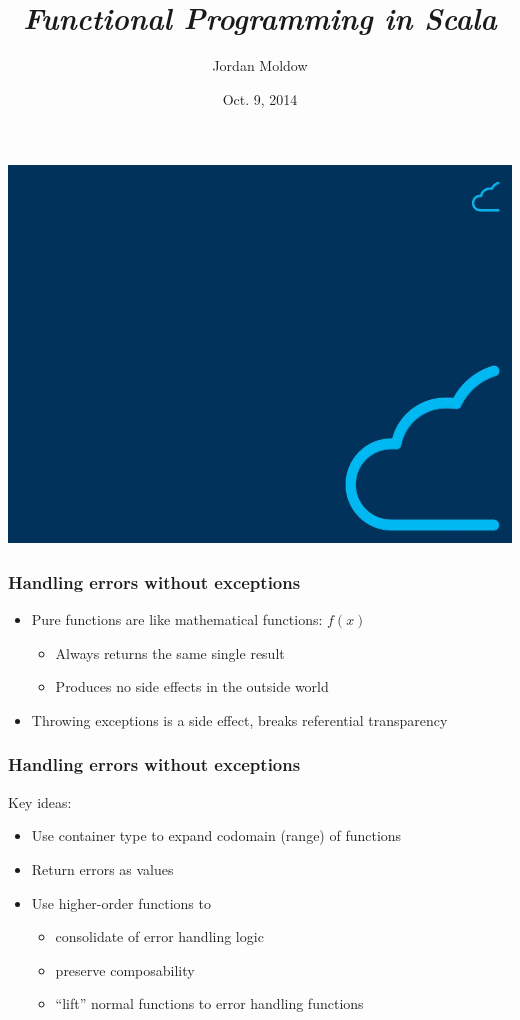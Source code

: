 \documentclass{beamer}
\title{\textit{Functional Programming in Scala}}
\subtitle{%
  Chapter 4\\%
  \subject%
}
\author{Jordan Moldow}
\date{Oct. 9, 2014}
\renewcommand{\subject}{Handling errors without exceptions}
\begin{document}
{
\usebackgroundtemplate%
{%
  \includegraphics[width=\paperwidth,height=\paperheight]{box-title.jpg}%
}
\frame{\titlepage}
}

\begin{frame}
  \frametitle{\subject}
  \begin{itemize}
    \item Pure functions are like mathematical functions: $f(x)$
      \begin{itemize}
        \item Always returns the same single result
        \item Produces no side effects in the outside world
      \end{itemize}
    \item Throwing exceptions is a side effect, breaks referential transparency
  \end{itemize}
\end{frame}
\begin{frame}
  \frametitle{\subject}
  Key ideas:
  \begin{itemize}
    \item Use container type to expand codomain (range) of functions
    \item Return errors as values
    \item Use higher-order functions to
      \begin{itemize}
        \item consolidate of error handling logic
        \item preserve composability
        \item ``lift'' normal functions to error handling functions
      \end{itemize}
  \end{itemize}
\end{frame}
\end{document}
